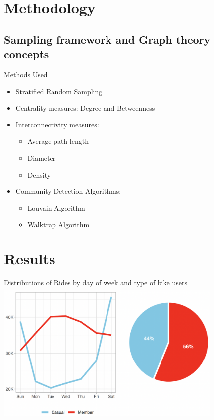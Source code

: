 \documentclass[11pt, xcolor=dvipsnames]{beamer}
\begin{document}
  
	\section{Methodology}
	\subsection{Sampling framework and Graph theory concepts}
	
	\begin{frame}{Methods Used}
		\begin{itemize}
			\item Stratified Random Sampling
				\item Centrality measures: Degree and Betweenness
			
			\item Interconnectivity measures: 
			\begin{itemize}
				\item Average path length
				\item Diameter
				\item Density
			\end{itemize}
		  \item Community Detection Algorithms:
		   	\begin{itemize}
		   		\item Louvain Algorithm
		   		\item Walktrap Algorithm
		   	\end{itemize}
		\end{itemize}
	\end{frame}
	\section{Results}

	\begin{frame}{Distributions of Rides by day of week and type of bike users}
		\centering
		\includegraphics[width=11cm, height=7cm]{images/member-casual-dayofweek}

	\end{frame}
\end{document}
